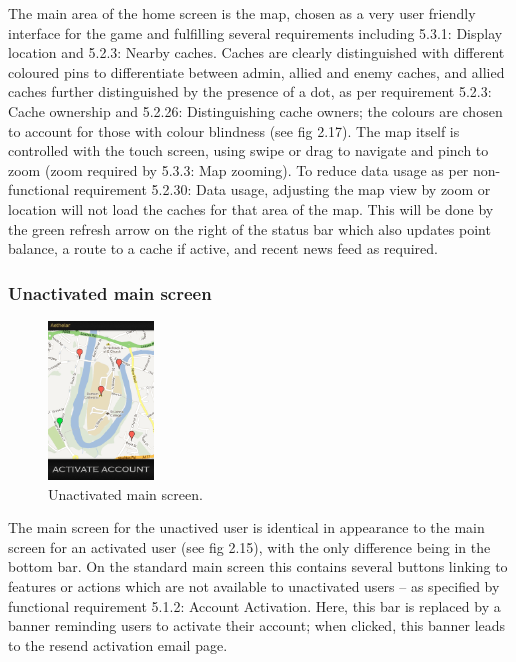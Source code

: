 The main area of the home screen is the map, chosen as a very user friendly interface for the game and fulfilling several requirements including 5.3.1: Display location and 5.2.3: Nearby caches. Caches are clearly distinguished with different coloured pins to differentiate between admin, allied and enemy caches, and allied caches further distinguished by the presence of a dot, as per requirement 5.2.3: Cache ownership and 5.2.26: Distinguishing cache owners; the colours are chosen to account for those with colour blindness (see fig 2.17). The map itself is controlled with the touch screen, using swipe or drag to navigate and pinch to zoom (zoom required by 5.3.3: Map zooming). To reduce data usage as per non-functional requirement 5.2.30: Data usage, adjusting the map view by zoom or location will not load the caches for that area of the map. This will be done by the green refresh arrow on the right of the status bar which also updates point balance, a route to a cache if active, and recent news feed as required.

\subsubsection{Unactivated main screen}

\begin{figure}
	\vspace{-50pt}
	\begin{center}
	\includegraphics[width=0.25\textwidth]{images/unauthorised_main_mockup}
	\caption{Unactivated main screen.}
	\label{unactivated_main}
	\end{center}
	\vspace{-50pt}
\end{figure}

The main screen for the unactived user is identical in appearance to the main screen for an activated user (see fig 2.15), with the only difference being in the bottom bar. On the standard main screen this contains several buttons linking to features or actions which are not available to unactivated users – as specified by functional requirement 5.1.2: Account Activation. Here, this bar is replaced by a banner reminding users to activate their account; when clicked, this banner leads to the resend activation email page.

